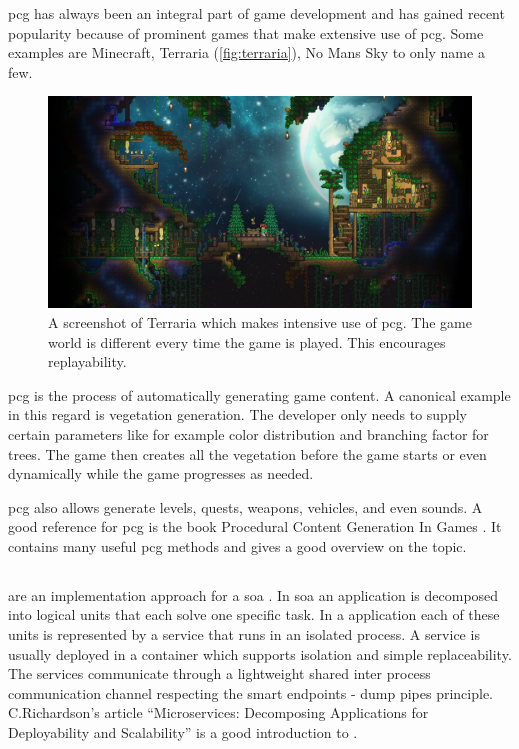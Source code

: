 \gls{pcg} has always been an integral part of game
development and has gained recent popularity because of prominent games that
make extensive use of \gls{pcg}. Some examples are Minecraft, Terraria
(\autoref{fig:terraria}), No Mans Sky to only name a few.

\begin{figure}
	\centering
	\includegraphics[width=\textwidth]{images/terraria}
	\caption{A screenshot of Terraria which makes intensive use of \gls{pcg}. The game
	world is different every time the game is played. This encourages
	replayability.}
	\label{fig:terraria}
\end{figure}

\gls{pcg} is the process of automatically generating game content. A canonical
example in this regard is vegetation generation. The developer only needs to
supply certain parameters like for example color distribution and branching
factor for trees. The game then creates all the vegetation before the game
starts or even dynamically while the game progresses as needed.

\gls{pcg} also allows generate levels, quests, weapons, vehicles, and even
sounds. A good reference for \gls{pcg} is the book Procedural Content Generation In
Games \cite{shaker2014procedural}. It contains many useful \gls{pcg} methods and
gives a good overview on the topic.

\subsection{\mssuc{}}

\mssuc{} are an implementation approach for a \gls{soa}
\cite{zimmermann2016microservices}. In \gls{soa} an application is decomposed
into logical units that each solve one specific task. In a \ms{} application
each of these units is represented by a service that runs in an isolated
process. A service is usually deployed in a container which supports isolation
and simple replaceability. The services communicate through a lightweight shared
inter process communication channel respecting the smart endpoints - dump pipes
principle. C.Richardson's article ``Microservices: Decomposing Applications for
Deployability and Scalability'' \cite{richardson2014mss} is a good introduction to
\mss{}.

